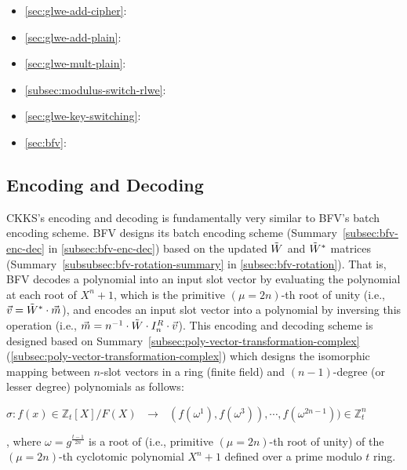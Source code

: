 \begin{tcolorbox}
\begin{itemize}
\item \autoref{sec:glwe-add-cipher}: 
\item \autoref{sec:glwe-add-plain}: 
\item \autoref{sec:glwe-mult-plain}: 
\item \autoref{subsec:modulus-switch-rlwe}: 
\item \autoref{sec:glwe-key-switching}: 
\item \autoref{sec:bfv}: 
\end{itemize}
\end{tcolorbox}

\clearpage


\subsection{Encoding and Decoding}
\label{subsec:ckks-encoding-decoding}


CKKS's encoding and decoding is fundamentally very similar to BFV's batch encoding scheme. BFV designs its batch encoding scheme (Summary~\ref*{subsec:bfv-enc-dec} in \autoref{subsec:bfv-enc-dec}) based on the updated $\tilde W$ and $\tilde W^*$ matrices (Summary~\ref*{subsubsec:bfv-rotation-summary} in \autoref{subsec:bfv-rotation}). That is, BFV decodes a polynomial into an input slot vector by evaluating the polynomial at each root of $X^n+1$, which is the primitive $(\mu=2n)$-th root of unity (i.e., $\vec{v} = \tilde W^* \cdot \vec{m}$), and encodes an input slot vector into a polynomial by inversing this operation (i.e., $\vec{m} = n^{-1} \cdot \tilde W \cdot I_n^R \cdot \vec{v}$). This encoding and decoding scheme is designed based on Summary~\ref*{subsec:poly-vector-transformation-complex} (\autoref{subsec:poly-vector-transformation-complex}) which designs the isomorphic mapping between $n$-slot vectors in a ring (finite field) and $(n-1)$-degree (or lesser degree) polynomials as follows:

$\sigma: f(x) \in \mathbb{Z}_t[X] / F(X) \text{ } \longrightarrow \text{ } (f(\omega^1), f(\omega^3)), \cdots, f(\omega^{2n-1})) \in \mathbb{Z}_t^n$

, where $\omega = g^{\frac{t - 1}{2n}}$ is a root of (i.e., primitive $(\mu=2n)$-th root of unity) of the $(\mu=2n)$-th cyclotomic polynomial $X^n + 1$ defined over a prime modulo $t$ ring.

$ $

